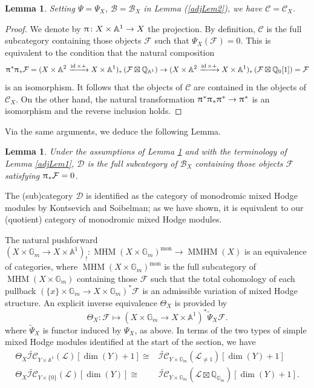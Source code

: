 \documentclass[a4paper,10pt]{amsart}
\renewcommand{\pi}{\uppi\hspace{0.05em}}
\newtheorem{lemma}[theorem]{Lemma}
\renewcommand{\AA}{\mathbb{A}}
\newcommand{\GG}{\mathbb{G}}
\newcommand{\ICSn}{\tilde{\mathcal{IC}}}
\DeclareMathOperator{\mon}{mon}
\DeclareMathOperator{\MMHM}{MMHM}
\DeclareMathOperator{\MHM}{MHM}
\DeclareMathOperator{\id}{id}
\begin{document}
\begin{lemma}
\label{wrapup1}
Setting $\Psi=\Psi_X$, $\mathcal{B}=\mathcal{B}_X$ in Lemma (\ref{adjLem2}), we have $\mathcal{C}=\mathcal{C}_X$.
\end{lemma}
\begin{proof}
We denote by $\pi\colon X\times\mathbb{A}^1\rightarrow X$ the projection.  By definition, $\mathcal{C}$ is the full subcategory containing those objects $\mathcal{F}$ such that $\Psi_X(\mathcal{F})=0$.  This is equivalent to the condition that the natural composition
\[
\pi^*\pi_*\mathcal{F}=(X\times\mathbb{A}^2\xrightarrow{\id\times +} X\times \mathbb{A}^1)_*\left(\mathcal{F}\boxtimes \mathbb{Q}_{\mathbb{A}^1}\right)\rightarrow (X\times\mathbb{A}^2\xrightarrow{\id\times +} X\times \mathbb{A}^1)_*\left(\mathcal{F}\boxtimes \mathbb{Q}_{0}[1]\right)=\mathcal{F}
\]
is an isomorphism.  It follows that the objects of $\mathcal{C}$ are contained in the objects of $\mathcal{C}_X$.  On the other hand, the natural transformation $\pi^*\pi_*\pi^*\rightarrow \pi^*$ is an isomorphism and the reverse inclusion holds.
\end{proof}
Via the same arguments, we deduce the following Lemma.
\begin{lemma}
Under the assumptions of Lemma \ref{wrapup1} and with the terminology of Lemma \ref{adjLem1}, $\mathcal{D}$ is the full subcategory of $\mathcal{B}_X$ containing those objects $\mathcal{F}$ satisfying $\pi_*\mathcal{F}=0$.
\end{lemma}

The (sub)category $\mathcal{D}$ is identified as the category of monodromic mixed Hodge modules by Kontsevich and Soibelman; as we have shown, it is equivalent to our (quotient) category of monodromic mixed Hodge modules.

The natural pushforward $(X\times\GG_m\rightarrow X\times\AA^1)_!\colon \MHM(X\times\GG_m)^{\mon}\rightarrow\MMHM(X)$ is an equivalence of categories, where $\MHM(X\times\GG_m)^{\mon}$ is the full subcategory of $\MHM(X\times\GG_m)$ containing those $\mathcal{F}$ such that the total cohomology of each pullback $(\{x\}\times\GG_m\rightarrow X\times\GG_m)^*\mathcal{F}$ is an admissible variation of mixed Hodge structure.  An explicit inverse equivalence $\Theta_X$ is provided by
\begin{equation}
\label{ThetaDef}
\Theta_X\colon\mathcal{F}\mapsto (X\times\GG_m\rightarrow X\times\AA^1)^*\tilde{\Psi}_X\mathcal{F}.
\end{equation}
where $\tilde{\Psi}_X$ is functor induced by $\Psi_X$, as above.  In terms of the two types of simple mixed Hodge modules identified at the start of the section, we have 
\begin{align*}
\Theta_X\ICSn_{Y\times \mathbb{A}^1}(\mathcal{L})[\dim(Y)+1]\cong &\ICSn_{Y\times \mathbb{G}_m}(\mathcal{L}_{\neq 1})[\dim(Y)+1]\\
\Theta_X\ICSn_{Y\times \{0\}}(\mathcal{L})[\dim(Y)]\cong &\ICSn_{Y\times \mathbb{G}_m}(\mathcal{L}\boxtimes \mathbb{Q}_{\mathbb{G}_m})[\dim(Y)+1].
\end{align*}
\end{document}
